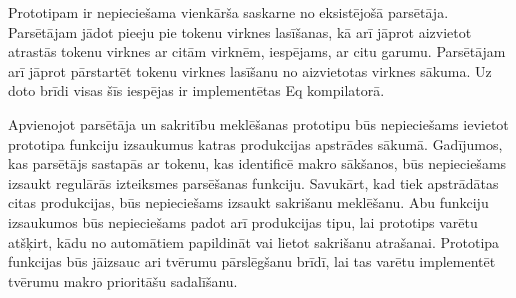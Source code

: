 Prototipam ir nepieciešama vienkārša saskarne no eksistējošā parsētāja. Parsētājam jādot pieeju pie tokenu virknes lasīšanas, kā arī jāprot aizvietot atrastās tokenu virknes ar citām virknēm, iespējams, ar citu garumu. Parsētājam arī jāprot pārstartēt tokenu virknes lasīšanu no aizvietotas virknes sākuma. Uz doto brīdi visas šīs iespējas ir implementētas Eq kompilatorā.

Apvienojot parsētāja un sakritību meklēšanas prototipu būs nepieciešams ievietot prototipa funkciju izsaukumus katras produkcijas apstrādes sākumā. Gadījumos, kas parsētājs sastapās ar tokenu, kas identificē makro sākšanos, būs nepieciešams izsaukt regulārās izteiksmes parsēšanas funkciju. Savukārt, kad tiek apstrādātas citas produkcijas, būs nepieciešams izsaukt sakrišanu meklēšanu. Abu funkciju izsaukumos būs nepieciešams padot arī produkcijas tipu, lai prototips varētu atšķirt, kādu no automātiem papildināt vai lietot sakrišanu atrašanai. Prototipa funkcijas būs jāizsauc ari tvērumu pārslēgšanu brīdī, lai tas varētu implementēt tvērumu makro prioritāšu sadalīšanu.